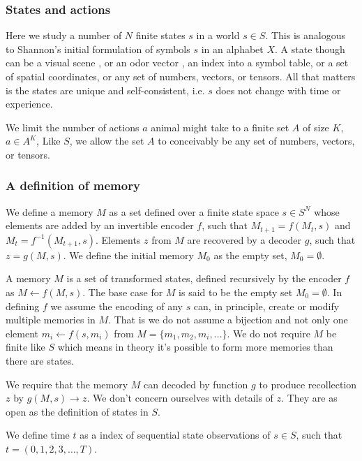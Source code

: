 \subsubsection*{States and actions}
Here we study a number of $N$ finite states $s$ in a world $s \in S$. This is analogous to Shannon's initial formulation of symbols $s$ in an alphabet $X$. A state though can be a visual scene \cite{Mnih2015}, or an odor vector \cite{Dasgupta2017,Calhoun2014}, an index into a symbol table, or a set of spatial coordinates, or any set of numbers, vectors, or tensors. All that matters is the states are unique and self-consistent, i.e. $s$ does not change with time or experience. 

We limit the number of actions $a$ animal might take to a finite set $A$ of size $K$, $a \in A^K$, Like $S$, we allow the set $A$ to conceivably be any set of numbers, vectors, or tensors.

\subsubsection*{A definition of memory}
\begin{definition}
    \label{def:memory}
    We define a memory $M$ as a set defined over a finite state space $s \in S^N$ whose elements are added by an invertible encoder $f$, such that $M_{t+1} = f(M_{t}, s)$ and $M_{t} = f^{-1}(M_{t+1}, s)$. Elements $z$ from $M$ are recovered by a decoder $g$, such that $z = g(M, s)$. We define the initial memory $M_{0}$ as the empty set, $M_{0} = \emptyset$.
\end{definition}

A memory $M$ is a set of transformed states, defined recursively by the encoder $f$ as $M \leftarrow f(M, s)$. The base case for $M$ is said to be the empty set $M_{0} = \emptyset$. In defining $f$ we assume the encoding  of any $s$ can, in principle, create or modify multiple memories in $M$. That is we do not assume a bijection  and not only one element $m_i \leftarrow f(s, m_i)$ from $M = \{m_1, m_2, m_i, \ldots\}$. We do not require $M$ be finite like $S$ which means in theory it's possible to form more memories than there are states. 

We require that the memory $M$ can decoded by function $g$ to produce recollection $z$ by $g(M, s) \rightarrow z$. We don't concern ourselves with details of $z$. They are as open as the definition of states in $S$.

We define time $t$ as a index of sequential state observations of $s \in S$, such that $t = (0,1,2,3,\ldots,T)$.

